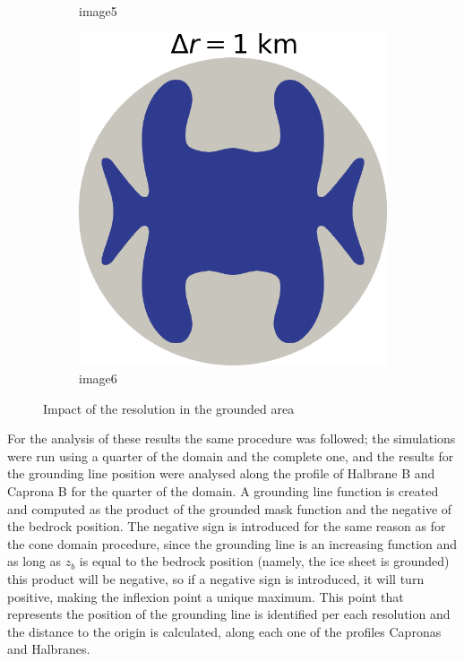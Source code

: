 \documentclass{article}
\begin{document}
\begin{figure}[!h]
\begin{subfigure}{0.25\textwidth}
		\caption{image5}
		\label{fig:5}
	\end{subfigure}\hfil %
	\begin{subfigure}{0.25\textwidth}
		\includegraphics[width=\linewidth]{../fig/Grounded_zone_1km.png}
		\caption{image6}
		\label{fig:6}
	\end{subfigure}
	\caption{Impact of the resolution in the grounded area}
	\label{Thule_resolutions}
\end{figure}

For the analysis of these results the same procedure was followed; the simulations were run using a quarter of the domain and the complete one, and the results for the grounding line position were analysed along the profile of Halbrane B and Caprona B for the quarter of the domain. A grounding line function is created and computed as the product of the grounded mask function and the negative of the bedrock position. The negative sign is introduced for the same reason as for the cone domain procedure, since the grounding line is an increasing function and as long as $z_b$ is equal to the bedrock position (namely, the ice sheet is grounded) this product will be negative, so if a negative sign is introduced, it will turn positive, making the inflexion point a unique maximum. This point that represents the position of the grounding line is identified per each resolution and the distance to the origin is calculated, along each one of the profiles Capronas and Halbranes.
\end{document}
